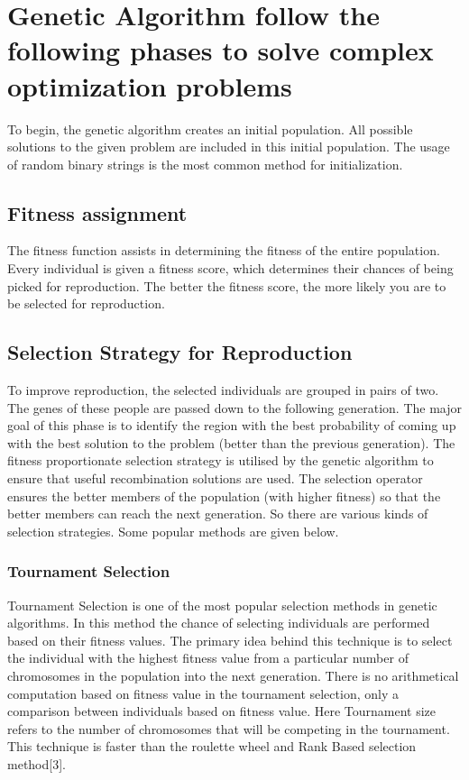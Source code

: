 \documentclass{article}
\begin{document}
\section{Genetic Algorithm follow the following phases to solve complex optimization problems}
To begin, the genetic algorithm creates an initial population. All possible solutions to the given problem are included
in this initial population. The usage of random binary strings is the most common method for initialization.
\subsection{Fitness assignment}
The fitness function assists in determining the fitness of the entire population. Every
individual is given a fitness score, which determines their chances of being picked for reproduction. The better the
fitness score, the more likely you are to be selected for reproduction.
\subsection{Selection Strategy for Reproduction}
To improve reproduction, the selected individuals are grouped in pairs of
two. The genes of these people are passed down to the following generation. The major goal of this phase is to
identify the region with the best probability of coming up with the best solution to the problem (better than the
previous generation). The fitness proportionate selection strategy is utilised by the genetic algorithm to ensure that
useful recombination solutions are used. The selection operator ensures the better members of the population (with
higher fitness) so that the better members can reach the next generation. So there are various kinds of selection
strategies. Some popular methods are given below.
\subsubsection{Tournament Selection}
Tournament Selection is one of the most popular selection methods in genetic algorithms. In this method the chance
of selecting individuals are performed based on their fitness values. The primary idea behind this technique is to select the individual with the highest fitness value from a particular number of chromosomes in the population into
the next generation. There is no arithmetical computation based on fitness value in the tournament selection, only a
comparison between individuals based on fitness value. Here Tournament size refers to the number of chromosomes
that will be competing in the tournament. This technique is faster than the roulette wheel and Rank Based selection
method[3].
\end{document}
